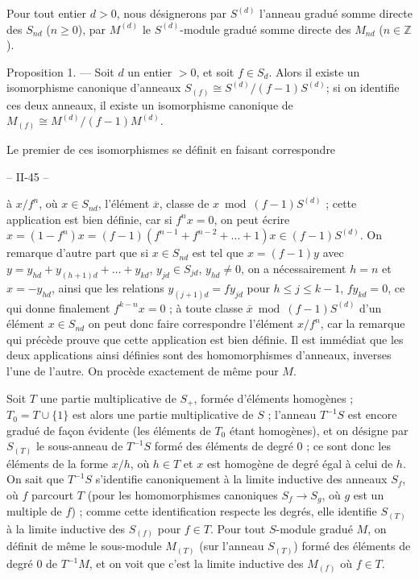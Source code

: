 Pour tout entier $d > 0$, nous désignerons par $S^{(d)}$ l'anneau gradué somme directe des $S_{nd}$ ($n \geqslant 0$), par $M^{(d)}$ le $S^{(d)}$-module gradué somme directe des $M_{nd}$ ($n \in \mathbb{Z}$).

Proposition 1. — Soit $d$ un entier $> 0$, et soit $f \in S_d$. Alors il existe un isomorphisme canonique d'anneaux $S_{(f)} \cong S^{(d)} / (f-1)S^{(d)}$; si on identifie ces deux anneaux, il existe un isomorphisme canonique de $M_{(f)} \cong M^{(d)} / (f-1)M^{(d)}$.

Le premier de ces isomorphismes se définit en faisant correspondre

\newpage


-- II-45 --

à $x/f^n$, où $x \in S_{nd}$, l'élément $\overline{x}$, classe de $x \bmod (f-1)S^{(d)}$ ; cette application est bien définie, car si $f^n x = 0$, on peut écrire $x = (1-f^n)x = (f-1)(f^{n-1} + f^{n-2} + \dots + 1)x \in (f-1)S^{(d)}$. On remarque d'autre part que si $x \in S_{nd}$ est tel que $x = (f-1)y$ avec $y = y_{hd} + y_{(h+1)d} + \dots + y_{kd}$, $y_{jd} \in S_{jd}$, $y_{hd} \neq 0$, on a nécessairement $h=n$ et $x = -y_{hd}$, ainsi que les relations $y_{(j+1)d} = f y_{jd}$ pour $h \le j \le k-1$, $f y_{kd} = 0$, ce qui donne finalement $f^{k-n}x = 0$ ; à toute classe $\overline{x} \bmod (f-1)S^{(d)}$ d'un élément $x \in S_{nd}$ on peut donc faire correspondre l'élément $x/f^n$, car la remarque qui précède prouve que cette application est bien définie. Il est immédiat que les deux applications ainsi définies sont des homomorphismes d'anneaux, inverses l'une de l'autre. On procède exactement de même pour $M$.

Soit $T$ une partie multiplicative de $S_+$, formée d'éléments homogènes ; $T_0 = T \cup \{1\}$ est alors une partie multiplicative de $S$ ; l'anneau $T^{-1}S$ est encore gradué de façon évidente (les éléments de $T_0$ étant homogènes), et on désigne par $S_{(T)}$ le sous-anneau de $T^{-1}S$ formé des éléments de degré $0$ ; ce sont donc les éléments de la forme $x/h$, où $h \in T$ et $x$ est homogène de degré égal à celui de $h$. On sait que $T^{-1}S$ s'identifie canoniquement à la limite inductive des anneaux $S_f$, où $f$ parcourt $T$ (pour les homomorphismes canoniques $S_f \to S_g$, où $g$ est un multiple de $f$) ; comme cette identification respecte les degrés, elle identifie $S_{(T)}$ à la limite inductive des $S_{(f)}$ pour $f \in T$. Pour tout $S$-module gradué $M$, on définit de même le sous-module $M_{(T)}$ (sur l'anneau $S_{(T)}$) formé des éléments de degré $0$ de $T^{-1}M$, et on voit que c'est la limite inductive des $M_{(f)}$ où $f \in T$.

